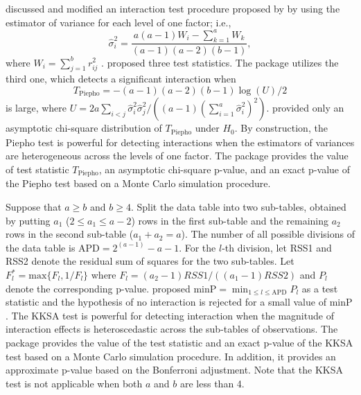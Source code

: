 \noindent {} \citet{Piepho:1994} discussed and modified an interaction test procedure proposed by \citet{MR:1977} by using the estimator of variance for each level of one factor; i.e.,
\[ \hat{\sigma}^2_{i}=\frac{a\left(a-1\right) W_{i}-\sum_{k=1}^a W_{k}}{\left(a-1\right)\left(a-2\right)\left(b-1\right)}, \]
where  $W_{i}=\sum_{j=1}^b r_{ij}^2$ . \citet{Piepho:1994} proposed three test statistics. The  package utilizes the third one, which detects a significant interaction when
\[ T_{\text{Piepho}}=-\left(a-1\right)\left(a-2\right)\left(b-1\right)\log(U)/2 \]
is large, where $ U=2a \sum_{i<j} \hat{\sigma}^2_{i} \hat{\sigma}^2_{j}/\left(\left(a-1\right) \left(\sum_{i=1}^a \hat{\sigma}^2_{i}\right)^2\right)$. \citet{Piepho:1994} provided only an asymptotic chi-square distribution of $T_{\text{Piepho}}$ under $H_0$. By construction, the Piepho test is powerful for detecting interactions when the estimators of variances are heterogeneous across the levels of one factor. The package  provides the value of test statistic $T_{\text{Piepho}}$, an asymptotic chi-square p-value, and an exact p-value of the Piepho test based on a Monte Carlo simulation procedure. 

\noindent {} Suppose that $a\geq b$ and $b \geq4$. Split the data table into two sub-tables, obtained by putting $a_1$ ($2\leq a_1 \leq a-2$) rows in the first sub-table and the remaining $a_2$ rows in the second sub-table ($a_1+a_2=a$). The number of all possible divisions of the data table is $\text{APD}=2^{\left(a-1\right)}-a-1$. For the $l$-th division, let RSS1 and RSS2 denote the residual sum of squares for the two sub-tables. Let $F_l^*=\text{max}\{F_l,1/F_l\}$ where $F_l=\left(a_2-1\right)RSS1/\left(\left(a_1-1\right)RSS2\right)$ and $P_l$ denote the corresponding p-value. \citet{KKSA:2007} proposed $\text{minP}=\min_{1\leq l \leq \text{APD}} P_l$  as a test statistic and the hypothesis of no interaction is rejected for a small value of $\text{minP}$. The KKSA test is powerful for detecting interaction when the magnitude of interaction effects is heteroscedastic across the sub-tables of observations. The package  provides the value of the test statistic and an exact p-value of the KKSA test based on a Monte Carlo simulation procedure. In addition, it provides an approximate p-value based on the Bonferroni adjustment. Note that the KKSA test is not applicable when both $a$ and $b$ are less than {4}.
 

